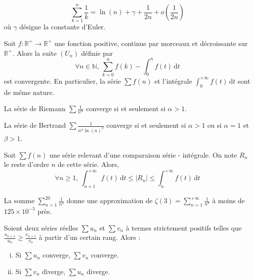 	
	\begin{application}
		\[ \sum_{k=1}^n \frac{1}{k} = \ln(n) + \gamma + \frac{1}{2n} + o \left( \frac{1}{2n} \right) \]
		où $\gamma$ désigne la constante d'Euler.
	\end{application}
	
	\begin{proposition}
		Soit $f : \mathbb{R}^+ \rightarrow \mathbb{R}^+$ une fonction positive, continue par morceaux et décroissante sur $\mathbb{R}^+$. Alors la suite $(U_n)$ définie par
		\[ \forall n \in \mathbb{N}, \, \sum_{k=0}^n f(k) - \int_0^n f(t) \, \mathrm{d}t \]
		est convergente. En particulier, la série $\sum f(n)$ et l'intégrale $\int_0^{+\infty} f(t) \, \mathrm{d}t$ sont de même nature.
	\end{proposition}
	
	\begin{example}
		La série de Riemann $\sum \frac{1}{n^\alpha}$ converge si et seulement si $\alpha > 1$.
	\end{example}
	
	\begin{example}
		La série de Bertrand $\sum \frac{1}{n^\alpha \ln(n)^\beta}$ converge si et seulement si $\alpha > 1$ ou si $\alpha = 1$ et $\beta > 1$.
	\end{example}
	
	
	\begin{proposition}
		Soit $\sum f(n)$ une série relevant d'une comparaison série - intégrale. On note $R_n$ le reste d'ordre $n$ de cette série. Alors,
		\[ \forall n \geq 1, \, \int_{n+1}^{+\infty} f(t) \, \mathrm{d}t \leq |R_n| \leq \int_{n}^{+\infty} f(t) \, \mathrm{d}t \]
	\end{proposition}
	
	\begin{example}
		La somme $\sum_{n=1}^{20} \frac{1}{n^3}$ donne une approximation de $\zeta(3) = \sum_{n=1}^{+\infty} \frac{1}{n^3}$ à moins de $125 \times 10^{-5}$ près.
	\end{example}
	
	
	\begin{proposition}
		Soient deux séries réelles $\sum u_n$ et $\sum v_n$ à termes strictement positifs telles que $\frac{u_{n+1}}{u_n} \geq \frac{v_{n+1}}{v_n}$ à partir d'un certain rang. Alors :
		\begin{enumerate}[(i)]
			\item Si $\sum u_n$ converge, $\sum v_n$ converge.
			\item Si $\sum v_n$ diverge, $\sum u_n$ diverge.
		\end{enumerate}
	\end{proposition}
	
